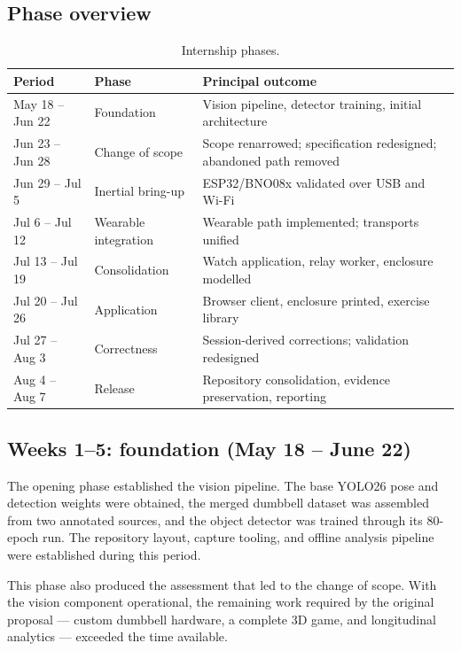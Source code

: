 \documentclass[11pt,a4paper]{article}
\begin{document}
\subsection{Phase overview}

\begin{table}[H]
\centering
\small
\caption{Internship phases.}
\begin{tabularx}{\textwidth}{@{}L{2.6cm} L{3.4cm} Y@{}}
\toprule
\textbf{Period} & \textbf{Phase} & \textbf{Principal outcome} \\
\midrule
May 18 -- Jun 22 & Foundation & Vision pipeline, detector training, initial architecture \\
Jun 23 -- Jun 28 & Change of scope & Scope renarrowed; specification redesigned; abandoned path removed \\
Jun 29 -- Jul 5 & Inertial bring-up & ESP32/BNO08x validated over USB and Wi-Fi \\
Jul 6 -- Jul 12 & Wearable integration & Wearable path implemented; transports unified \\
Jul 13 -- Jul 19 & Consolidation & Watch application, relay worker, enclosure modelled \\
Jul 20 -- Jul 26 & Application & Browser client, enclosure printed, exercise library \\
Jul 27 -- Aug 3 & Correctness & Session-derived corrections; validation redesigned \\
Aug 4 -- Aug 7 & Release & Repository consolidation, evidence preservation, reporting \\
\bottomrule
\end{tabularx}
\end{table}

\subsection{Weeks 1--5: foundation (May 18 -- June 22)}

The opening phase established the vision pipeline. The base YOLO26 pose and
detection weights were obtained, the merged dumbbell dataset was assembled from
two annotated sources, and the object detector was trained through its 80-epoch
run. The repository layout, capture tooling, and offline analysis pipeline were
established during this period.

This phase also produced the assessment that led to the change of scope. With the
vision component operational, the remaining work required by the original
proposal --- custom dumbbell hardware, a complete 3D game, and longitudinal
analytics --- exceeded the time available.
\end{document}
